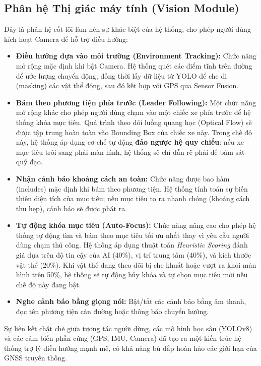 \documentclass[../DoAn.tex]{subfiles}
\begin{document}
\subsection{Phân hệ Thị giác máy tính (Vision Module)}
Đây là phân hệ cốt lõi làm nên sự khác biệt của hệ thống, cho phép người dùng kích hoạt Camera để hỗ trợ điều hướng:
\begin{itemize}
    \item \textbf{Điều hướng dựa vào môi trường (Environment Tracking):} Chức năng mở rộng mặc định khi bật Camera. Hệ thống quét các điểm tĩnh trên đường để ước lượng chuyển động, đồng thời lấy dữ liệu từ YOLO để che đi (masking) các vật thể động, sau đó kết hợp với GPS qua Sensor Fusion.
    \item \textbf{Bám theo phương tiện phía trước (Leader Following):} Một chức năng mở rộng khác cho phép người dùng chạm vào một chiếc xe phía trước để hệ thống khóa mục tiêu. Quá trình theo dõi luồng quang học (Optical Flow) sẽ được tập trung hoàn toàn vào Bounding Box của chiếc xe này. Trong chế độ này, hệ thống áp dụng cơ chế tự động \textbf{đảo ngược hệ quy chiếu}: nếu xe mục tiêu trôi sang phải màn hình, hệ thống sẽ chỉ dẫn rẽ phải để bám sát quỹ đạo.
    \item \textbf{Nhận cảnh báo khoảng cách an toàn:} Chức năng được bao hàm (includes) mặc định khi bám theo phương tiện. Hệ thống tính toán sự biến thiên diện tích của mục tiêu; nếu mục tiêu to ra nhanh chóng (khoảng cách thu hẹp), cảnh báo sẽ được phát ra.
    \item \textbf{Tự động khóa mục tiêu (Auto-Focus):} Chức năng nâng cao cho phép hệ thống tự động tìm và bám theo mục tiêu tối ưu nhất thay vì yêu cầu người dùng chạm thủ công. Hệ thống áp dụng thuật toán \textit{Heuristic Scoring} đánh giá dựa trên độ tin cậy của AI (40\%), vị trí trung tâm (40\%), và kích thước vật thể (20\%). Khi vật thể đang theo dõi bị che khuất hoặc vượt ra khỏi màn hình trên 50\%, hệ thống sẽ tự động hủy khóa và tự chọn mục tiêu mới nếu chế độ này đang bật.
    \item \textbf{Nghe cảnh báo bằng giọng nói:} Bật/tắt các cảnh báo bằng âm thanh, đọc tên phương tiện cản đường hoặc thông báo chuyển hướng.
\end{itemize}

Sự liên kết chặt chẽ giữa tương tác người dùng, các mô hình học sâu (YOLOv8) và các cảm biến phần cứng (GPS, IMU, Camera) đã tạo ra một kiến trúc hệ thống trợ lý điều hướng mạnh mẽ, có khả năng bù đắp hoàn hảo các giới hạn của GNSS truyền thống.
\end{document}
